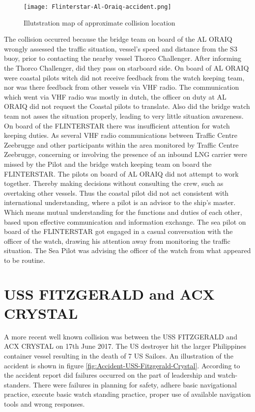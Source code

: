 \begin{figure}[H]
	\centering
	\texttt{[image: Flinterstar-Al-Oraiq-accident.png]}
	\caption{Illutstration map of approximate collision location}
	\label{fig:Accident-Flinterstar-Al-Oraiq}
\end{figure}

The collision occurred because the bridge team on board of the AL ORAIQ wrongly assessed the traffic situation, vessel's speed and distance from the S3 buoy, prior to contacting the nearby vessel Thorco Challenger. After informing the Thorco Challenger, did they pass on starboard side. On board of AL ORAIQ were coastal pilots witch did not receive feedback from the watch keeping team, nor was there feedback from other vessels via \ac{VHF} radio. The communication which went via VHF radio was mostly in dutch, the officer on duty at AL ORAIQ did not request the Coastal pilots to translate. Also did the bridge watch team not asses the situation properly, leading to very little situation awareness.
On board of the FLINTERSTAR there was insufficient attention for watch keeping duties. As several VHF radio communications between Traffic Centre Zeebrugge and other participants within the area monitored by Traffic Centre Zeebrugge, concerning or involving the presence of an inbound LNG carrier were missed by the Pilot and the bridge watch keeping team on board the FLINTERSTAR.
The pilots on board of AL ORAIQ did not attempt to work together. Thereby making decisions without consulting the crew, such as overtaking other vessels. Thus the coastal pilot did not act consistent with international understanding, where a pilot is an advisor to the ship's master. Which means mutual understanding for the functions and duties of each other, based upon effective communication and information exchange. 
The sea pilot on board of the FLINTERSTAR got engaged in a casual conversation with the officer of the watch, drawing his attention away from monitoring the traffic situation. The Sea Pilot was advising the officer of the watch from what appeared to be routine. \cite{Backer2015}

\newpage
\section{USS FITZGERALD and ACX CRYSTAL}
A more recent well known collision was between the USS FITZGERALD and ACX CRYSTAL on 17th June 2017. The US destroyer hit the larger Philippines container vessel resulting in the death of 7 US Sailors. An illustration of the accident is shown in figure \ref{fig:Accident-USS-Fitzgerald-Crystal}. According to the accident report did failures occurred on the part of leadership and watch-standers. There were failures in planning for safety, adhere basic navigational practice, execute basic watch standing practice, proper use of available navigation tools and wrong responses.

